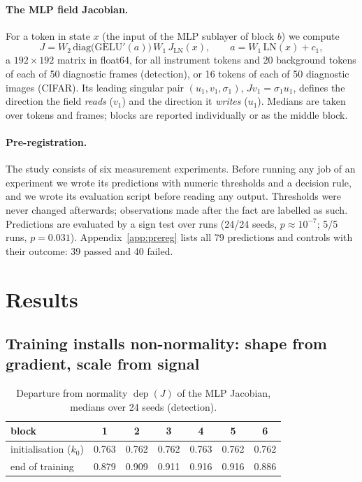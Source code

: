 \documentclass[10pt]{article}
\newcommand{\dep}{\operatorname{dep}}
\begin{document}
\paragraph{The MLP field Jacobian.} For a token in state $x$ (the input of the MLP sublayer of block $b$) we compute
\begin{equation}
J=W_2\,\mathrm{diag}\big(\mathrm{GELU}'(a)\big)\,W_1\,J_{\mathrm{LN}}(x),\qquad a=W_1\,\mathrm{LN}(x)+c_1,
\end{equation}
a $192\times192$ matrix in float64, for all instrument tokens and 20 background tokens of each of 50 diagnostic frames (detection), or 16
tokens of each of 50 diagnostic images (CIFAR). Its leading singular pair $(u_1,v_1,\sigma_1)$, $Jv_1=\sigma_1u_1$, defines the direction
the field \emph{reads} ($v_1$) and the direction it \emph{writes} ($u_1$). Medians are taken over tokens and frames; blocks are reported
individually or as the middle block.

\paragraph{Pre-registration.} The study consists of six measurement experiments. Before running any job of an experiment we wrote its
predictions with numeric thresholds and a decision rule, and we wrote its evaluation script before reading any output. Thresholds were
never changed afterwards; observations made after the fact are labelled as such. Predictions are evaluated by a sign test over runs
(24/24 seeds, $p\approx10^{-7}$; 5/5 runs, $p=0.031$). Appendix~\ref{app:prereg} lists all 79 predictions and controls with their
outcome: 39 passed and 40 failed.

\section{Results}

\subsection{Training installs non-normality: shape from gradient, scale from signal}
\label{sec:installs}

\begin{table}[t]
\centering
\caption{Departure from normality $\dep(J)$ of the MLP Jacobian, medians over 24 seeds (detection).}
\label{tab:dep}
\begin{tabular}{lcccccc}
\toprule
block & 1 & 2 & 3 & 4 & 5 & 6\\
\midrule
initialisation ($k_0$) & 0.763 & 0.762 & 0.762 & 0.763 & 0.762 & 0.762\\
end of training & 0.879 & 0.909 & 0.911 & 0.916 & 0.916 & 0.886\\
\bottomrule
\end{tabular}
\end{table}
\end{document}

